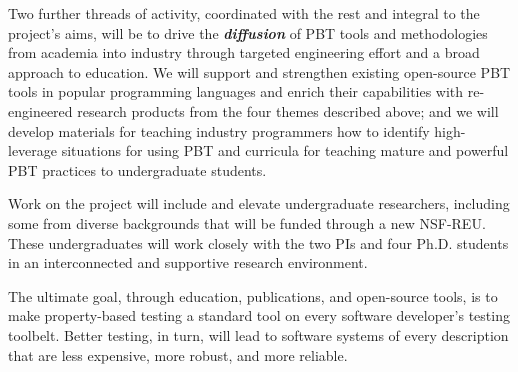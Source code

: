 
Two further threads of activity, coordinated with the rest and integral to the
project's aims, will
%
be to drive the {\bf\em diffusion} of PBT tools and
methodologies from academia into industry through targeted engineering effort
and a broad approach to education.
We will support and strengthen existing
open-source PBT tools in popular programming languages and enrich their
capabilities with re-engineered research products from the four themes described
above;
%
and we will
develop materials for teaching industry programmers how to identify
high-leverage situations for using PBT and curricula for teaching mature
and powerful PBT practices to undergraduate students.
%

Work on the project will include and elevate undergraduate
researchers, including some from diverse backgrounds that will be
funded through a new NSF-REU. These undergraduates will work
closely with the two PIs and four Ph.D.{} students in an interconnected and supportive
research environment.

The ultimate goal, through education, publications, and open-source
tools, is to make property-based testing a standard tool on every
software developer's testing toolbelt.  Better testing, in turn, will
lead to software systems of every description that are less expensive, more
robust, and more reliable.


